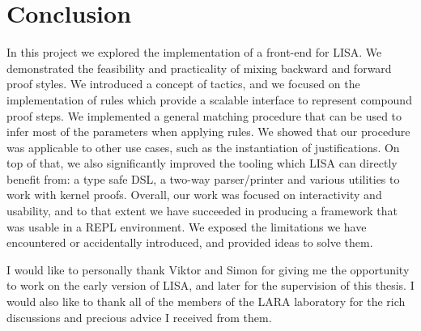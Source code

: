 \section{Conclusion}
\label{sec:conclusion}

In this project we explored the implementation of a front-end for LISA. We demonstrated the feasibility and practicality of mixing backward and forward proof styles. We introduced a concept of tactics, and we focused on the implementation of rules which provide a scalable interface to represent compound proof steps. We implemented a general matching procedure that can be used to infer most of the parameters when applying rules. We showed that our procedure was applicable to other use cases, such as the instantiation of justifications. On top of that, we also significantly improved the tooling which LISA can directly benefit from: a type safe DSL, a two-way parser/printer and various utilities to work with kernel proofs. Overall, our work was focused on interactivity and usability, and to that extent we have succeeded in producing a framework that was usable in a REPL environment. We exposed the limitations we have encountered or accidentally introduced, and provided ideas to solve them.

I would like to personally thank Viktor and Simon for giving me the opportunity to work on the early version of LISA, and later for the supervision of this thesis. I would also like to thank all of the members of the LARA laboratory for the rich discussions and precious advice I received from them.
